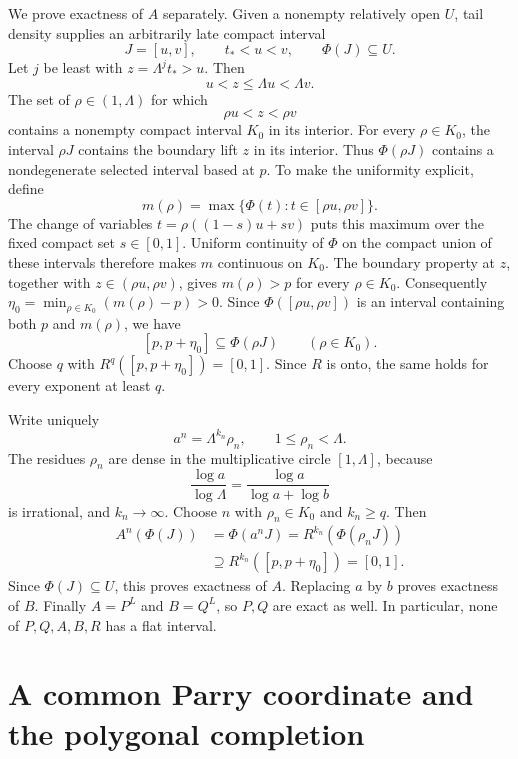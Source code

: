 \documentclass[11pt]{article}
\theoremstyle{definition}
\theoremstyle{remark}
\newcommand{\I}{[0,1]}
\begin{document}
We prove exactness of \(A\) separately.  Given a nonempty relatively open
\(U\), tail density supplies an arbitrarily late compact interval
\[
 J=[u,v],\qquad t_*<u<v,\qquad\Phi(J)\subseteq U.
\]
Let \(j\) be least with \(z=\Lambda^jt_*>u\).  Then
\[
 u<z\leq\Lambda u<\Lambda v.
\]
The set of \(\rho\in(1,\Lambda)\) for which
\[
 \rho u<z<\rho v
\]
contains a nonempty compact interval \(K_0\) in its interior.  For every
\(\rho\in K_0\), the interval \(\rho J\) contains the boundary lift \(z\)
in its interior.  Thus \(\Phi(\rho J)\) contains a nondegenerate selected
interval based at \(p\).  To make the uniformity explicit, define
\[
 m(\rho)=\max\{\Phi(t):t\in[\rho u,\rho v]\}.
\]
The change of variables \(t=\rho((1-s)u+sv)\) puts this maximum over the
fixed compact set \(s\in[0,1]\).  Uniform continuity of \(\Phi\) on the
compact union of these intervals therefore makes \(m\) continuous on
\(K_0\).  The boundary property at \(z\), together with
\(z\in(\rho u,\rho v)\), gives \(m(\rho)>p\) for every \(\rho\in K_0\).
Consequently
\(\eta_0=\min_{\rho\in K_0}(m(\rho)-p)>0\).  Since
\(\Phi([\rho u,\rho v])\) is an interval containing both \(p\) and
\(m(\rho)\), we have
\begin{equation}\label{eq:analytic-uniform-selected}
 [p,p+\eta_0]\subseteq\Phi(\rho J)
 \qquad(\rho\in K_0).
\end{equation}
Choose \(q\) with \(R^q([p,p+\eta_0])=\I\).  Since \(R\) is onto, the same
holds for every exponent at least \(q\).

Write uniquely
\[
 a^n=\Lambda^{k_n}\rho_n,\qquad1\leq\rho_n<\Lambda.
\]
The residues \(\rho_n\) are dense in the multiplicative circle
\([1,\Lambda]\), because
\[
 \frac{\log a}{\log\Lambda}
 =\frac{\log a}{\log a+\log b}
\]
is irrational, and \(k_n\to\infty\).  Choose \(n\) with
\(\rho_n\in K_0\) and \(k_n\geq q\).  Then
\[
\begin{split}
 A^n(\Phi(J))
 &=\Phi(a^nJ)
 =R^{k_n}(\Phi(\rho_nJ))\\
 &\supseteq R^{k_n}([p,p+\eta_0])=\I.
\end{split}
\]
Since \(\Phi(J)\subseteq U\), this proves exactness of \(A\).  Replacing
\(a\) by \(b\) proves exactness of \(B\).  Finally \(A=P^L\) and \(B=Q^L\),
so \(P,Q\) are exact as well.  In particular, none of
\(P,Q,A,B,R\) has a flat interval.

\section{A common Parry coordinate and the polygonal completion}
\end{document}
